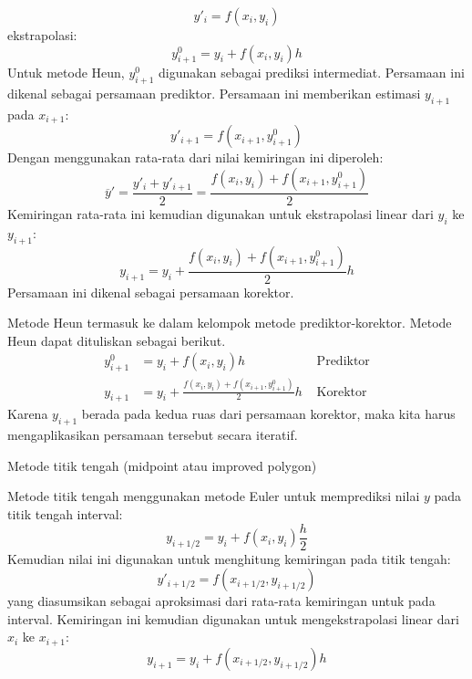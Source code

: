 \begin{equation*}
y'_{i} = f(x_i, y_i)
\end{equation*}
ekstrapolasi:
\begin{equation*}
y^{0}_{i+1} = y_{i} + f(x_i, y_i) h
\end{equation*}
Untuk metode Heun, $y^{0}_{i+1}$ digunakan sebagai prediksi intermediat.
Persamaan ini dikenal sebagai persamaan prediktor.
Persamaan ini memberikan estimasi $y_{i+1}$ pada $x_{i+1}$:
\begin{equation*}
y'_{i+1} = f(x_{i+1}, y^{0}_{i+1})
\end{equation*}
Dengan menggunakan rata-rata dari nilai kemiringan ini diperoleh:
\begin{equation*}
\overline{y}' = \frac{y'_{i} + y'_{i+1}}{2} = 
\frac{f(x_i, y_i) + f(x_{i+1},y^{0}_{i+1})}{2}
\end{equation*}
Kemiringan rata-rata ini kemudian digunakan untuk ekstrapolasi linear dari $y_{i}$ ke
$y_{i+1}$:
\begin{equation*}
y_{i+1} = y_{i} + \frac{f(x_i, y_i) + f(x_{i+1}, y^{0}_{i+1})}{2} h
\end{equation*}
Persamaan ini dikenal sebagai persamaan korektor.

Metode Heun termasuk ke dalam kelompok metode prediktor-korektor. Metode Heun dapat
dituliskan sebagai berikut.
\begin{align*}
y^{0}_{i+1} & = y_{i} + f(x_i, y_i) h & \text{   Prediktor}\\
y_{i+1} & = y_{i} + \frac{f(x_i, y_i) + f(x_{i+1}, y^{0}_{i+1})}{2} h & \text{   Korektor}
\end{align*}
Karena $y_{i+1}$ berada pada kedua ruas dari persamaan korektor, maka kita harus mengaplikasikan
persamaan tersebut secara iteratif.

Metode titik tengah (midpoint atau improved polygon)

Metode titik tengah menggunakan metode Euler untuk memprediksi nilai $y$ pada titik tengah
interval:
\begin{equation*}
y_{i+1/2} = y_{i} + f(x_i, y_i) \frac{h}{2}
\end{equation*}
Kemudian nilai ini digunakan untuk menghitung kemiringan pada titik tengah:
\begin{equation*}
y'_{i+1/2} = f(x_{i+1/2}, y_{i+1/2})
\end{equation*}
yang diasumsikan sebagai aproksimasi dari rata-rata kemiringan untuk pada interval.
Kemiringan ini kemudian digunakan untuk mengekstrapolasi linear dari $x_i$ ke $x_{i+1}$:
\begin{equation*}
y_{i+1} = y_{i} + f(x_{i+1/2}, y_{i+1/2}) h
\end{equation*}

